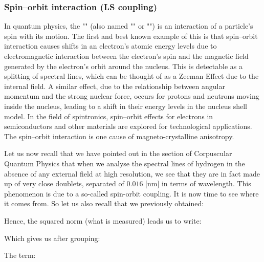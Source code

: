 	\subsubsection{Spin–orbit interaction (LS coupling)}\label{ls coupling}
	In quantum physics, the "" (also named ""  or "") is an interaction of a particle's spin with its motion. The first and best known example of this is that spin–orbit interaction causes shifts in an electron's atomic energy levels due to electromagnetic interaction between the electron's spin and the magnetic field generated by the electron's orbit around the nucleus. This is detectable as a splitting of spectral lines, which can be thought of as a Zeeman Effect due to the internal field. A similar effect, due to the relationship between angular momentum and the strong nuclear force, occurs for protons and neutrons moving inside the nucleus, leading to a shift in their energy levels in the nucleus shell model. In the field of spintronics, spin–orbit effects for electrons in semiconductors and other materials are explored for technological applications. The spin–orbit interaction is one cause of magneto-crystalline anisotropy.
	
	Let us now recall that we have pointed out in the section of Corpuscular Quantum Physics that when we analyse the spectral lines of hydrogen in the absence of any external field at high resolution, we see that they are in fact made up of very close doublets, separated of $0.016$ [nm] in terms of wavelength. This phenomenon is due to a so-called spin-orbit coupling. It is now time to see where it comes from. So let us also recall that we previously obtained:
	
	Hence, the squared norm (what is measured) leads us to write:
	
	Which gives us after grouping:
	
	The term:
	
